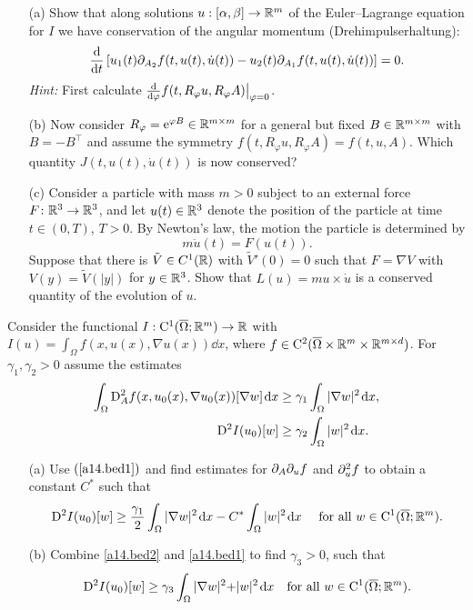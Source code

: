 \documentclass[12pt,a4paper]{article}
\begin{document}
\begin{itemize}
\item[(a)]  Show that along solutions  $u:[\alpha,\beta]\to{\mathbb R}^m$ of the
Euler--Lagrange equation for $I$ we have conservation of the 
angular momentum (Drehimpulserhaltung):
\[
\frac{{\mathrm d} }{{\mathrm d} t} \left[ u_1(t)\partial_{A_2}f(t,u(t),\dot{u}(t)) - 
u_2(t)\partial_{A_1}f(t,u(t),\dot{u}(t))\right]= 0.
\]
\emph{Hint:} First calculate $\frac{{\mathrm d}}{{\mathrm d} \varphi} 
f(t,R_\varphi{}u,R_\varphi{}A)\big|_{\varphi=0}$.


\item[(b)] Now consider $R_\varphi=\mathrm{e}^{\varphi{}B}\in{\mathbb R}^{m\times{}m}$ for a
  general but fixed $B\in{\mathbb R}^{m\times{}m}$ with $B=-B^\top$ and assume the
  symmetry 
$f(t,R_\varphi{}u,R_\varphi{}A)=f(t,u,A)$. Which quantity  $J(t,u(t),\dot{u}(t))$
is now conserved?

\item[(c)]
Consider a particle with mass $m>0$ subject to an external force $F\colon{\mathbb R}^3\to{\mathbb R}^3$,
and let $u(t)\in{\mathbb R}^3$ denote the position of the particle at time $t\in(0,T)$, $T>0$.
By Newton's law,
the motion the particle is determined by
\[
m \ddot u (t) = F(u(t)).
\]
Suppose that there is $\tilde V\in C^1({\mathbb R})$ with $\tilde V'(0)=0$ such that 
$F=\nabla V$
with $V(y)=\tilde V(|y|)$ for $y\in{\mathbb R}^3$.
Show that $L(u)=m u\times \dot u$ is a conserved quantity
of the evolution of $u$.



\end{itemize}

Consider the functional $I:{\mathrm C}^1(\overline\Omega;{\mathbb R}^m) \to {\mathbb R}$ with
$I(u) = \int_\Omega f(x,u(x),\nabla u(x))\dd x$, where $f\in
{\mathrm C}^2(\overline\Omega\times{\mathbb R}^m\times {\mathbb R}^{m\times d})$. 
For $\gamma_1, \gamma_2 > 0$ assume the estimates
\begin{align}
  \label{a14.bed1}
   \int_\Omega {\mathrm D}_A^2f(x,u_0(x),\nabla u_0(x)) [\nabla w]\;\!\mathrm{d}
   x & \geq \gamma_1\int_\Omega |\nabla w|^2\;\!\mathrm{d} x ,\\ 
  \label{a14.bed2}
  {\mathrm D}^2I(u_0)[w] & \geq \gamma_2 \int_\Omega |w|^2 \;\!\mathrm{d} x.
\end{align}
\begin{itemize}
\item[(a)] Use $(\ref{a14.bed1})$ and find estimates for  $\partial_A\partial_uf$
and $\partial^2_u f$ to obtain a constant $C^*$ such that 
\[
{\mathrm D}^2 I(u_0)[w] \geq \frac{\gamma_1}{2} \int_\Omega |\nabla w|^2\;\!\mathrm{d} x 
- C^* \int_\Omega |w|^2 \;\!\mathrm{d} x \quad\text{ for all }w\in {\mathrm C}^1(\overline\Omega;{\mathbb R}^m).
\]
\item[(b)] Combine \eqref{a14.bed2} and \eqref{a14.bed1} to find  $\gamma_3 >
0$, such that 
\[
{\mathrm D}^2I(u_0)[w] \geq \gamma_3\int_\Omega |\nabla w|^2
{+} |w|^2 \;\!\mathrm{d} x \ \ \text{   for all } w\in {\mathrm C}^1(\overline{\Omega};{\mathbb R}^m).
\]
\end{itemize}
\end{document}
